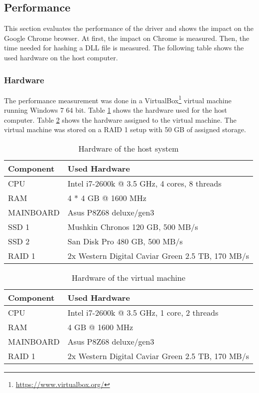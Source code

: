 \subsection{Performance}
This section evaluates the performance of the driver and shows the impact on the Google Chrome browser. At first, the impact on Chrome is measured. Then, the time needed for hashing a DLL file is measured. The following table shows the used hardware on the host computer.

\subsubsection{Hardware}
The performance measurement was done in a VirtualBox\footnote{\url{https://www.virtualbox.org/}} virtual machine running Windows 7 64 bit. Table \ref{fig:hardware_host} shows the hardware used for the host computer. Table \ref{fig:hardware_vm} shows the hardware assigned to the virtual machine. The virtual machine was stored on a RAID 1 setup with 50 GB of assigned storage. 
\def\arraystretch{1.1}%

\begin{table}[]
\centering
\begin{tabularx}{\textwidth}{|l|X|}
\hline
Component & Used Hardware \\ \hline
CPU & Intel i7-2600k @ 3.5 GHz, 4 cores, 8 threads \\ \hline
RAM & 4 * 4 GB @ 1600 MHz \\ \hline
MAINBOARD & Asus P8Z68 deluxe/gen3 \\ \hline
SSD 1 & Mushkin Chronos 120 GB, 500 MB/s \\ \hline
SSD 2 & San Disk Pro 480 GB, 500 MB/s \\ \hline
RAID 1 & 2x Western Digital Caviar Green 2.5 TB, 170 MB/s \\ \hline
\end{tabularx}
\caption{Hardware of the host system}
\label{fig:hardware_host}
\end{table}

\begin{table}[]
\centering
\begin{tabularx}{\textwidth}{|l|X|}
\hline
Component & Used Hardware \\ \hline
CPU & Intel i7-2600k @ 3.5 GHz, 1 core, 2 threads \\ \hline
RAM & 4 GB @ 1600 MHz \\ \hline
MAINBOARD & Asus P8Z68 deluxe/gen3 \\ \hline
RAID 1 & 2x Western Digital Caviar Green 2.5 TB, 170 MB/s \\ \hline
\end{tabularx}
\caption{Hardware of the virtual machine}
\label{fig:hardware_vm}
\end{table}

